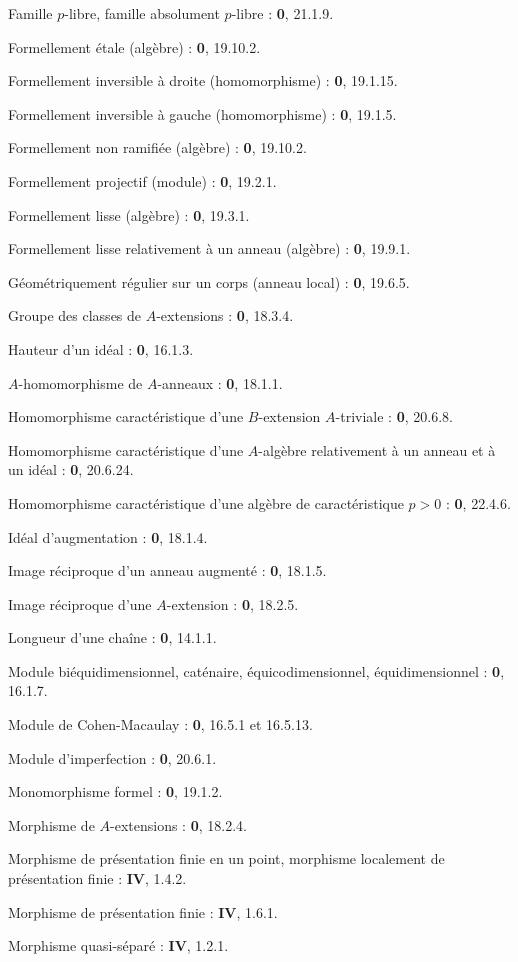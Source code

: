 Famille $p$-libre, famille absolument $p$-libre : \textbf{0}, 21.1.9.\par
Formellement étale (algèbre) : \textbf{0}, 19.10.2.\par
Formellement inversible à droite (homomorphisme) : \textbf{0}, 19.1.15.\par
Formellement inversible à gauche (homomorphisme) : \textbf{0}, 19.1.5.\par
Formellement non ramifiée (algèbre) : \textbf{0}, 19.10.2.\par
Formellement projectif (module) : \textbf{0}, 19.2.1.\par
Formellement lisse (algèbre) : \textbf{0}, 19.3.1.\par
Formellement lisse relativement à un anneau (algèbre) : \textbf{0}, 19.9.1.\par

Géométriquement régulier sur un corps (anneau local) : \textbf{0}, 19.6.5.\par
Groupe des classes de $A$-extensions : \textbf{0}, 18.3.4.\par

Hauteur d'un idéal : \textbf{0}, 16.1.3.\par
$A$-homomorphisme de $A$-anneaux : \textbf{0}, 18.1.1.\par
Homomorphisme caractéristique d'une $B$-extension $A$-triviale : \textbf{0}, 20.6.8.\par
Homomorphisme caractéristique d'une $A$-algèbre relativement à un anneau et à un idéal : \textbf{0}, 20.6.24.\par
Homomorphisme caractéristique d'une algèbre de caractéristique $p>0$ : \textbf{0}, 22.4.6.\par

Idéal d'augmentation : \textbf{0}, 18.1.4.\par
Image réciproque d'un anneau augmenté : \textbf{0}, 18.1.5.\par
Image réciproque d'une $A$-extension : \textbf{0}, 18.2.5.\par

Longueur d'une chaîne : \textbf{0}, 14.1.1.\par

Module biéquidimensionnel, caténaire, équicodimensionnel, équidimensionnel : \textbf{0}, 16.1.7.\par
Module de Cohen-Macaulay : \textbf{0}, 16.5.1 et 16.5.13.\par
Module d'imperfection : \textbf{0}, 20.6.1.\par
Monomorphisme formel : \textbf{0}, 19.1.2.\par
Morphisme de $A$-extensions : \textbf{0}, 18.2.4.\par
Morphisme de présentation finie en un point, morphisme localement de présentation finie : \textbf{IV}, 1.4.2.\par
Morphisme de présentation finie : \textbf{IV}, 1.6.1.\par
Morphisme quasi-séparé : \textbf{IV}, 1.2.1.\par

